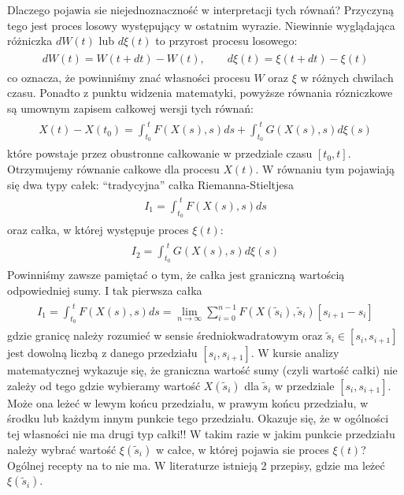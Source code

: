 \documentclass[a4paper,12pt,polish]{sphinxmanual}
\begin{document}
Dlaczego pojawia sie niejednoznaczność w interpretacji tych równań? Przyczyną tego jest proces losowy występujący w ostatnim wyrazie. Niewinnie wyglądająca różniczka $dW(t)$ lub $d\xi(t)$ to przyrost procesu losowego:
\label{ch3/chIII011:equation-eqn15}\begin{gather}
\begin{split}dW(t) = W(t+dt) - W(t), \qquad d\xi(t) = \xi(t+dt) - \xi(t)\end{split}\label{ch3/chIII011-eqn15}
\end{gather}
co oznacza, że powinniśmy znać własności procesu $W$ oraz $\xi$ w różnych chwilach czasu. Ponadto z punktu widzenia matematyki, powyższe równania rózniczkowe są umownym zapisem całkowej wersji tych równań:
\label{ch3/chIII011:equation-eqn16}\begin{gather}
\begin{split}X(t) - X(t_0) = \int_{t_0}^{\; t} F(X(s), s) ds + \int_{t_0}^{\;t} G(X(s), s) d\xi(s)\end{split}\label{ch3/chIII011-eqn16}
\end{gather}
które powstaje przez obustronne całkowanie w przedziale czasu $[t_0, t]$. Otrzymujemy równanie całkowe dla procesu $X(t)$. W równaniu tym pojawiają się dwa typy całek: ``tradycyjna'' całka Riemanna-Stieltjesa
\label{ch3/chIII011:equation-eqn17}\begin{gather}
\begin{split}I_1= \int_{t_0}^{\;t} F(X(s), s) ds\end{split}\label{ch3/chIII011-eqn17}
\end{gather}
oraz całka, w której występuje proces $\xi(t)$:
\label{ch3/chIII011:equation-eqn18}\begin{gather}
\begin{split}I_2= \int_{t_0}^{\;t} G(X(s), s) d\xi(s)\end{split}\label{ch3/chIII011-eqn18}
\end{gather}
Powinniśmy zawsze pamiętać o tym, że całka jest graniczną wartością odpowiedniej sumy. I tak pierwsza całka
\label{ch3/chIII011:equation-eqn19}\begin{gather}
\begin{split}I_1= \int_{t_0}^{\;t} F(X(s), s) ds = \lim_{n \to \infty} \sum_{i=0}^{n-1} F(X({\tilde s}_i), {\tilde s}_i) [s_{i+1} -s_i]\end{split}\label{ch3/chIII011-eqn19}
\end{gather}
gdzie granicę należy rozumieć w sensie średniokwadratowym oraz ${\tilde s}_i \in [s_i, s_{i+1}]$ jest dowolną liczbą z danego przedziału $[s_i, s_{i+1}]$. W kursie analizy matematycznej wykazuje się, że graniczna wartość sumy (czyli wartość całki) nie zależy od tego gdzie wybieramy wartość $X({\tilde s}_i)$ dla ${\tilde s}_i$ w przedziale $[s_i, s_{i+1}]$. Może ona leżeć w lewym końcu przedziału, w prawym końcu przedziału, w środku lub każdym innym punkcie tego przedziału. Okazuje się, że w ogólności tej własności nie ma drugi typ całki!! W takim razie w jakim punkcie przedziału należy wybrać wartość $\xi({\tilde s}_i)$ w całce, w której pojawia sie proces $\xi(t)$? Ogólnej recepty na to nie ma. W literaturze istnieją 2 przepisy, gdzie ma leżeć $\xi({\tilde s}_i)$.
\end{document}
